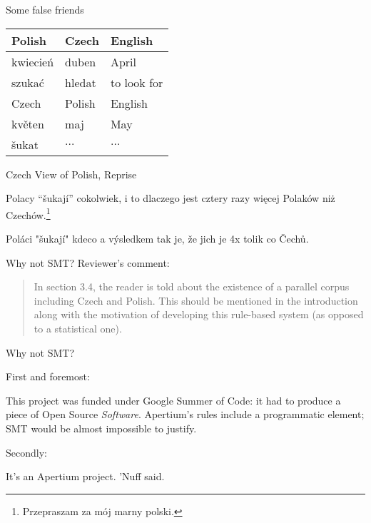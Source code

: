 \documentclass{beamer}
\begin{document}
\begin{frame}{Some false friends}
\begin{center}
    \begin{tabular}{ | l | l | l |}
    \hline
     Polish & Czech & English \\ 
     \hline
     kwiecie\'{n} & duben & April \\
     szuka\'{c} & hledat & to look for \\    
     \hline
     Czech & Polish & English \\ 
     \hline
     květen & maj & May \\
     \v{s}ukat & $\dots$ & $\dots$ \\
    \hline
    \end{tabular}
\end{center}
\end{frame}

\begin{frame}{Czech View of Polish, Reprise}

Polacy ``šukají'' cokolwiek, i to dlaczego jest cztery razy wi\k{e}cej Polaków
ni\.{z} Czechów.\footnote{Przepraszam za mój marny polski.}

{\footnotesize Poláci "šukají" kdeco a výsledkem tak je, že jich je 4x tolik co Čechů.}
\end{frame}



\begin{frame}{Why not SMT?}
Reviewer's comment:

\begin{quote}
In section 3.4, the reader is told about the existence of a parallel corpus 
including Czech and Polish. This should be mentioned in the introduction along 
with the motivation of developing this rule-based system 
(as opposed to a statistical one).
\end{quote}

%
%
%

\end{frame}

\begin{frame}{Why not SMT?}

First and foremost:

This project was funded under Google Summer of Code: it had to produce a piece
of Open Source {\em Software}. Apertium's rules include a programmatic element;
SMT would be almost impossible to justify.

\pause

Secondly:

It's an Apertium project. 'Nuff said.

\end{frame}
\end{document}
